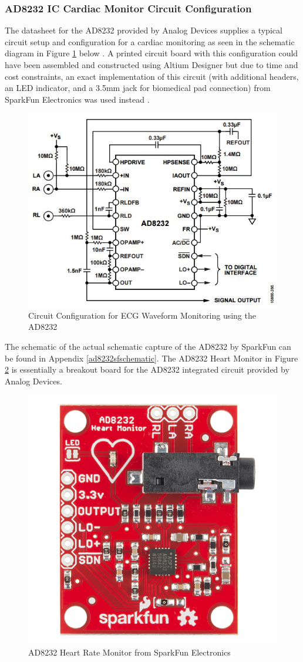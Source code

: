 \cite{ad8232analogdevices}

\cite{ad8232evalzuserguide}

\cite{ad8232datasheet}

\subsubsection*{AD8232 IC Cardiac Monitor Circuit Configuration}

The datasheet for the AD8232 provided by Analog Devices supplies a typical circuit setup and configuration for a cardiac monitoring as seen in the schematic diagram in Figure \ref{ad8232cardiacconfig} below \cite{ad8232datasheet}. A printed circuit board with this configuration could have been assembled and constructed using Altium Designer but due to time and cost constraints, an exact implementation of this circuit (with additional headers, an LED indicator, and a 3.5mm jack for biomedical pad connection) from SparkFun Electronics was used instead \cite{ad8232}.   

\begin{figure}[H]
	\centering
	\includegraphics[width=0.7\linewidth]{ad8232cardiacconfig.jpg}
	\caption{Circuit Configuration for ECG Waveform Monitoring using the AD8232 \cite{ad8232datasheet}}
	\label{ad8232cardiacconfig}
\end{figure}
 
The schematic of the actual schematic capture of the AD8232 by SparkFun can be found in Appendix \ref{ad8232sfschematic}. The AD8232 Heart Monitor in Figure \ref{ad8232sfboard} is essentially a breakout board for the AD8232 integrated circuit provided by Analog Devices. 

\begin{figure}[H]
	\centering
	\includegraphics[width=0.4\linewidth]{ad8232sfboard.jpg}
	\caption{AD8232 Heart Rate Monitor from SparkFun Electronics \cite{ad8232}}
	\label{ad8232sfboard}
\end{figure}

